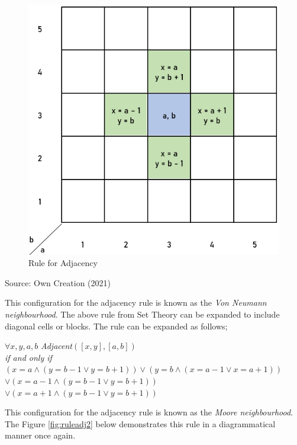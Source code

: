 \begin{figure}[H]
\centering
\includegraphics[scale=0.65]{Figures/Chapter2/adjacent}
\caption{Rule for Adjacency}
\label{fig:ruleadj}
\end{figure}
\begin{center}
Source: Own Creation (2021)
\end{center}
This configuration for the adjacency rule is known as the \textit{Von Neumann neighbourhood}\cite{ca}. The above rule from Set Theory can be expanded to include diagonal cells or blocks. The rule can be expanded as follows;
\begin{center}
$\forall x, y, a, b$ \textit{Adjacent}$([x, y], [a, b])$ \\ \textit{if and only if}\\$(x = a \land (y = b - 1 \lor y = b + 1)) \lor (y = b \land (x = a - 1 \lor x = a + 1))$\\ $\lor (x = a - 1 \land (y = b - 1 \lor y = b +1))$\\ $\lor (x = a + 1 \land (y = b - 1 \lor y = b + 1))$
\end{center}
This configuration for the adjacency rule is known as the \textit{Moore neighbourhood}\cite{ca}. The Figure \ref{fig:ruleadj2} below demonstrates this rule in a diagrammatical manner once again.
